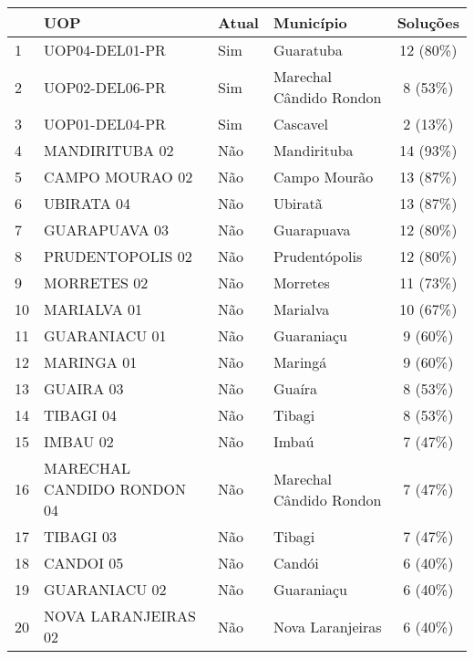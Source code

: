 {\begin{tabular}{l|l|l|l|c}\hline
   & UOP  & Atual  &  Município & Soluções \\ \hline\hline
 1 &             UOP04-DEL01-PR &   Sim &               Guaratuba & 12 (80\%) \\
 2 &             UOP02-DEL06-PR &   Sim & Marechal Cândido Rondon &  8 (53\%) \\
 3 &             UOP01-DEL04-PR &   Sim &                Cascavel &  2 (13\%) \\ \hline
 4 &             MANDIRITUBA 02 &   Não &             Mandirituba & 14 (93\%) \\
 5 &            CAMPO MOURAO 02 &   Não &            Campo Mourão & 13 (87\%) \\
 6 &                 UBIRATA 04 &   Não &                 Ubiratã & 13 (87\%) \\
 7 &              GUARAPUAVA 03 &   Não &              Guarapuava & 12 (80\%) \\
 8 &           PRUDENTOPOLIS 02 &   Não &           Prudentópolis & 12 (80\%) \\
 9 &                MORRETES 02 &   Não &                Morretes & 11 (73\%) \\
10 &                MARIALVA 01 &   Não &                Marialva & 10 (67\%) \\
11 &              GUARANIACU 01 &   Não &              Guaraniaçu &  9 (60\%) \\
12 &                 MARINGA 01 &   Não &                 Maringá &  9 (60\%) \\
13 &                  GUAIRA 03 &   Não &                  Guaíra &  8 (53\%) \\
14 &                  TIBAGI 04 &   Não &                  Tibagi &  8 (53\%) \\
15 &                   IMBAU 02 &   Não &                   Imbaú &  7 (47\%) \\
16 & MARECHAL CANDIDO RONDON 04 &   Não & Marechal Cândido Rondon &  7 (47\%) \\
17 &                  TIBAGI 03 &   Não &                  Tibagi &  7 (47\%) \\
18 &                  CANDOI 05 &   Não &                  Candói &  6 (40\%) \\
19 &              GUARANIACU 02 &   Não &              Guaraniaçu &  6 (40\%) \\
20 &        NOVA LARANJEIRAS 02 &   Não &        Nova Laranjeiras &  6 (40\%) \\

\end{tabular}}
